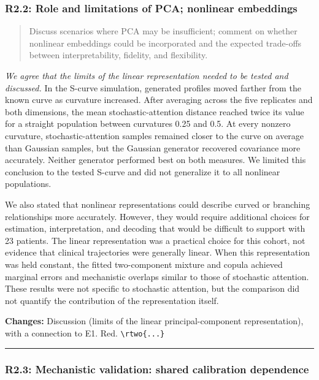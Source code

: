\documentclass[
  11pt,
  letterpaper,
]{article}
\begin{document}
\subsubsection{R2.2: Role and limitations of PCA; nonlinear embeddings}\label{r22-role-and-limitations-of-pca-nonlinear-embeddings}

\begin{quote}
Discuss scenarios where PCA may be insufficient; comment on whether nonlinear embeddings could be incorporated and the expected trade-offs between interpretability, fidelity, and flexibility.
\end{quote}

\emph{We agree that the limits of the linear representation needed to be tested and discussed.} In the S-curve simulation, generated profiles moved farther from the known curve as curvature increased. After averaging across the five replicates and both dimensions, the mean stochastic-attention distance reached twice its value for a straight population between curvatures 0.25 and 0.5. At every nonzero curvature, stochastic-attention samples remained closer to the curve on average than Gaussian samples, but the Gaussian generator recovered covariance more accurately. Neither generator performed best on both measures. We limited this conclusion to the tested S-curve and did not generalize it to all nonlinear populations.

We also stated that nonlinear representations could describe curved or branching relationships more accurately. However, they would require additional choices for estimation, interpretation, and decoding that would be difficult to support with 23 patients. The linear representation was a practical choice for this cohort, not evidence that clinical trajectories were generally linear. When this representation was held constant, the fitted two-component mixture and copula achieved marginal errors and mechanistic overlaps similar to those of stochastic attention. These results were not specific to stochastic attention, but the comparison did not quantify the contribution of the representation itself.

\textbf{Changes:} Discussion (limits of the linear principal-component representation), with a connection to E1. Red. \texttt{\textbackslash{}rtwo\{...\}}

\begin{center}\rule{0.5\linewidth}{0.5pt}\end{center}

\subsubsection{R2.3: Mechanistic validation: shared calibration dependence}\label{r23-mechanistic-validation-shared-calibration-dependence}
\end{document}
